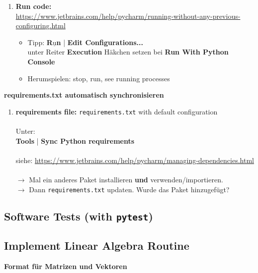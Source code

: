 \begin{enumerate}
		\item \textbf{Run code:}\\ \url{https://www.jetbrains.com/help/pycharm/running-without-any-previous-configuring.html}
		\begin{itemize}
			\item Tipp: \textbf{R$\underline{\text{u}}$n} | \textbf{Edit Configurations...} \\
			unter Reiter \textbf{Execution} Häkchen setzen bei \textbf{Run With Python Console}
			\item Herumspielen: stop, run, see running processes
		\end{itemize}
	\end{enumerate}
	


		\textbf{requirements.txt automatisch synchronisieren}
	
	\begin{enumerate}
		\item \textbf{requirements file:} \texttt{requirements.txt} with default configuration\\~\\
		Unter:\\
		\textbf{Tools} | \textbf{Sync Python requirements}~\\
		~\\
		siehe: \url{https://www.jetbrains.com/help/pycharm/managing-dependencies.html}\\~\\
		$\to$ Mal ein anderes Paket installieren \textbf{und} verwenden/importieren.\\
		$\to$ Dann \texttt{requirements.txt} updaten. Wurde das Paket hinzugefügt?
	\end{enumerate}	






\subsection{Software Tests (with \texttt{pytest})}

\subsection{Implement Linear Algebra Routine}


	
		\textbf{ Format für Matrizen und Vektoren}\\
	
